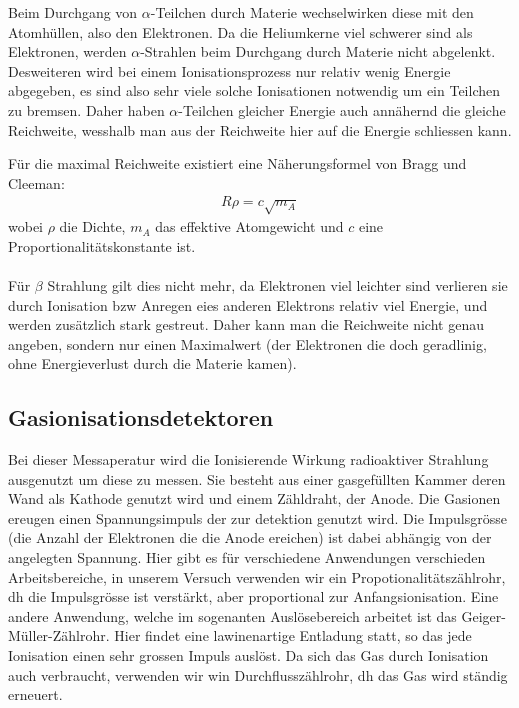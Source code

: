 \documentclass[12pt]{article}
\begin{document}
Beim Durchgang von $\alpha$-Teilchen durch Materie wechselwirken diese mit den Atomhüllen, also den Elektronen. Da die Heliumkerne viel schwerer sind als Elektronen, werden $\alpha$-Strahlen beim Durchgang durch Materie nicht abgelenkt. Desweiteren wird bei einem Ionisationsprozess nur relativ wenig Energie abgegeben, es sind also sehr viele solche Ionisationen notwendig um ein Teilchen zu bremsen. Daher haben $\alpha$-Teilchen gleicher Energie auch annähernd die gleiche Reichweite, wesshalb man aus der Reichweite hier auf die Energie schliessen kann. 

Für die maximal Reichweite existiert eine Näherungsformel von Bragg und Cleeman: 
\begin{align}
 R \rho=c\sqrt{m_A}
\end{align}
wobei $\rho$ die Dichte, $m_A$ das effektive Atomgewicht und $c$ eine Proportionalitätskonstante ist.
\\ \\
Für $\beta$ Strahlung gilt dies nicht mehr, da Elektronen viel leichter sind verlieren sie durch Ionisation bzw Anregen eies anderen Elektrons relativ viel Energie, und werden zusätzlich stark gestreut. Daher kann man die Reichweite nicht genau angeben, sondern nur einen Maximalwert (der Elektronen die doch geradlinig, ohne Energieverlust durch die Materie kamen).


\subsection{Gasionisationsdetektoren}

Bei dieser Messaperatur wird die Ionisierende Wirkung radioaktiver Strahlung ausgenutzt um diese zu messen. Sie besteht aus einer gasgefüllten Kammer deren Wand als Kathode genutzt wird und einem Zähldraht, der Anode. Die Gasionen ereugen einen Spannungsimpuls der zur detektion genutzt wird. Die Impulsgrösse (die Anzahl der Elektronen die die Anode ereichen) ist dabei abhängig von der angelegten Spannung. Hier gibt es für verschiedene Anwendungen verschieden Arbeitsbereiche, in unserem Versuch verwenden wir ein Propotionalitätszählrohr, dh die Impulsgrösse ist verstärkt, aber proportional zur Anfangsionisation. Eine andere Anwendung, welche im sogenanten Auslösebereich arbeitet ist das Geiger-Müller-Zählrohr. Hier findet eine lawinenartige Entladung statt, so das jede Ionisation einen sehr grossen Impuls auslöst. Da sich das Gas durch Ionisation auch verbraucht, verwenden wir win Durchflusszählrohr, dh das Gas wird ständig erneuert.
\end{document}
